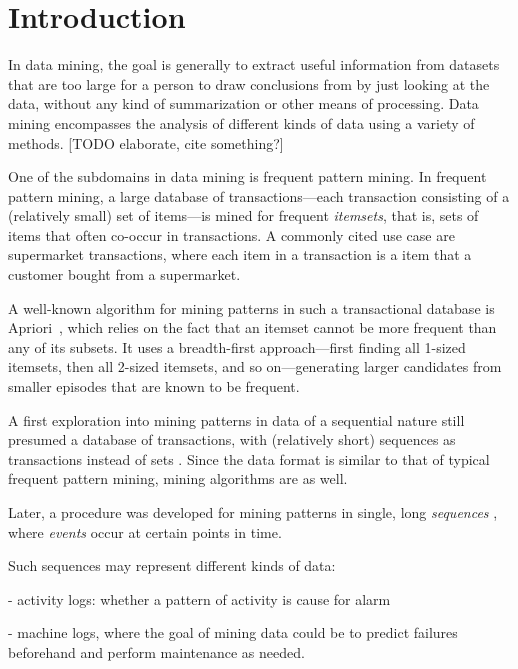 \chapter{Introduction}

In data mining, the goal is generally to extract useful information from datasets that are too large for a person to draw conclusions from by just looking at the data, without any kind of summarization or other means of processing. Data mining encompasses the analysis of different kinds of data using a variety of methods. [TODO elaborate, cite something?]

One of the subdomains in data mining is frequent pattern mining. In frequent pattern mining, a large database of transactions---each transaction consisting of a (relatively small) set of items---is mined for frequent \emph{itemsets}, that is, sets of items that often co-occur in transactions. A commonly cited use case are supermarket transactions, where each item in a transaction is a item that a customer bought from a supermarket.

A well-known algorithm for mining patterns in such a transactional database is Apriori~\citep{agrawal1994fast}, which relies on the fact that an itemset cannot be more frequent than any of its subsets. It uses a breadth-first approach---first finding all 1-sized itemsets, then all 2-sized itemsets, and so on---generating larger candidates from smaller episodes that are known to be frequent.


A first exploration into mining patterns in data of a sequential nature still presumed a database of transactions, with (relatively short) sequences as transactions instead of sets \citep{agrawal1995mining}.
Since the data format is similar to that of typical frequent pattern mining, mining algorithms are as well. %


Later, a procedure was developed for mining patterns in single, long \emph{sequences} \citep{mannila1997discovery}, where \emph{events} occur at certain points in time.

Such sequences may represent different kinds of data:

- activity logs: whether a pattern of activity is cause for alarm

- machine logs, where the goal of mining data could be to predict failures beforehand and perform maintenance as needed.

